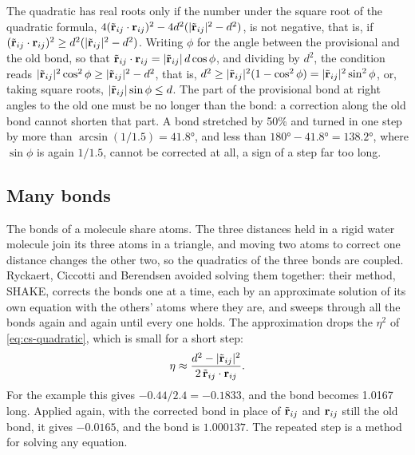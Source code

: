 The quadratic has real roots only if the number under the square root of
the quadratic formula, $4(\tilde{\bm{\mathrm{r}}}_{ij}\cdot\bm{\mathrm{r}}_{ij})^2 -
4d^2(\lvert\tilde{\bm{\mathrm{r}}}_{ij}\rvert^2 - d^2)$, is not negative, that is,
if $(\tilde{\bm{\mathrm{r}}}_{ij}\cdot\bm{\mathrm{r}}_{ij})^2 \ge d^2(\lvert\tilde{\bm{\mathrm{r}}}_{ij}
\rvert^2 - d^2)$. Writing
$\phi$ for the angle between the provisional and the old bond, so that
$\tilde{\bm{\mathrm{r}}}_{ij}\cdot\bm{\mathrm{r}}_{ij} = \lvert\tilde{\bm{\mathrm{r}}}_{ij}\rvert
\,d\cos\phi$, and dividing by $d^2$, the condition reads
$\lvert\tilde{\bm{\mathrm{r}}}_{ij}\rvert^2\cos^2\phi \ge \lvert\tilde{\bm{\mathrm{r}}}_{ij}
\rvert^2 - d^2$, that is, $d^2 \ge \lvert\tilde{\bm{\mathrm{r}}}_{ij}\rvert^2(1 -
\cos^2\phi) = \lvert\tilde{\bm{\mathrm{r}}}_{ij}\rvert^2\sin^2\phi$, or, taking
square roots, $\lvert\tilde{\bm{\mathrm{r}}}_{ij}\rvert\sin\phi \le d$. The part of the provisional bond at
right angles to the old one must be no longer than the bond: a correction
along the old bond cannot shorten that part. A bond stretched by 50\% and
turned in one step by more than $\arcsin(1/1.5) = \ang{41.8}$, and less
than $\ang{180} - \ang{41.8} = \ang{138.2}$, where $\sin\phi$ is again
$1/1.5$, cannot be corrected at all, a sign of a step far too long.

\subsection*{Many bonds}

The bonds of a molecule share atoms. The three distances held in a rigid
water molecule join its three atoms in a triangle, and moving two atoms to
correct one distance changes the other two, so the quadratics of the three
bonds are coupled. Ryckaert, Ciccotti and Berendsen avoided solving them
together\cite{Ryckaert1977}: their method, SHAKE, corrects the bonds one
at a time, each by an approximate solution of its own equation with the
others' atoms where they are, and sweeps through all the bonds again and
again until every one holds. The approximation drops the $\eta^2$ of
\cref{eq:cs-quadratic}, which is small for a short step:
\begin{equation}
   \eta \approx \frac{d^2 - \lvert\tilde{\bm{\mathrm{r}}}_{ij}\rvert^2}
   {2\,\tilde{\bm{\mathrm{r}}}_{ij}\cdot\bm{\mathrm{r}}_{ij}} .
   \label{eq:cs-linear}
\end{equation}
For the example this gives $-0.44/2.4 = -0.1833$, and the bond becomes
1.0167 long. Applied again, with the corrected bond in place of
$\tilde{\bm{\mathrm{r}}}_{ij}$ and $\bm{\mathrm{r}}_{ij}$ still the old bond, it gives
$-0.0165$, and
the bond is $1.000137$. The repeated step is a method for solving any
equation.

